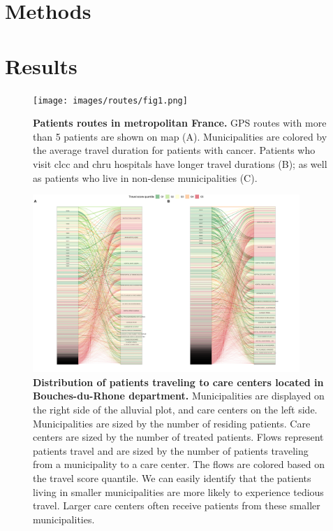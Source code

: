 \cite{the_shift_project_plan_2021}

\section{Methods}

\section{Results}

\begin{figure}[H]
    \texttt{[image: images/routes/fig1.png]}
    \centering
    \caption{
        \textbf{Patients routes in metropolitan France.} GPS routes with more than 5 patients are shown on map (A). Municipalities are colored by the average travel duration for patients with cancer. Patients who visit \ac{clcc} and \ac{chru} hospitals have longer travel durations (B); as well as patients who live in non-dense municipalities (C).
    }
    \label{fig:routes-duration-france}
\end{figure}

\begin{figure}[H]
    \includegraphics[width=0.9\textwidth]{images/routes/fig6.png}
    \centering
    \caption{
        \textbf{Distribution of patients traveling to care centers located in Bouches-du-Rhone department.} Municipalities are displayed on the right side of the alluvial plot, and care centers on the left side. Municipalities are sized by the number of residing patients. Care centers are sized by the number of treated patients. Flows represent patients travel and are sized by the number of patients traveling from a municipality to a care center. The flows are colored based on the travel score quantile. We can easily identify that the patients living in smaller municipalities are more likely to experience tedious travel. Larger care centers often receive patients from these smaller municipalities.
    }
    \label{fig:routes-alluvial-13}
\end{figure}

